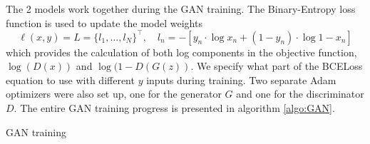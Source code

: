 \documentclass{article}
\begin{document}
The 2 models work together during the GAN training. The Binary-Entropy loss function is used to update the model weights
\begin{equation}
    \ell(x, y) = L = \{l_1, \dots, l_N\}^\top, \quad l_n = -\left[y_n\cdot \log{x_n} + (1-y_n)\cdot\log{1-x_n}\right]
\end{equation}
which provides the calculation of both log components in the objective function, $\log(D(x))$ and $\log(1-D(G(z))$. We specify what part of the BCELoss equation to use with different $y$ inputs during training. Two separate Adam optimizers were also set up, one for the generator $G$ and one for the discriminator $D$. The entire GAN training progress is presented in algorithm \ref{algo:GAN}.


\begin{minipage}[t]{.46\linewidth}
\begin{algorithm}[H]
\caption{GAN training}
\label{algo:GAN}
\SetAlgoLined
{}
\end{algorithm}
\end{minipage}
\hfill
\end{document}
